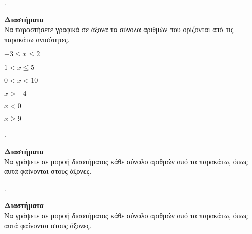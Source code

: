 \documentclass[11pt,a4paper,twocolumn]{article}
\newcounter{askhsh}
\newcommand{\askhsh}{\large\theaskhsh.\ \addtocounter{askhsh}{1}}
\begin{document}
\askhsh \textbf{Διαστήματα}\\
Να παραστήσετε γραφικά σε άξονα τα σύνολα αριθμών που ορίζονται από τις παρακάτω ανισότητες.
\begin{multicols}{3}
\begin{rlist}[leftmargin=2mm]
\item $ -3\leq x\leq 2 $
\item $ 1<x\leq 5 $
\item $ 0<x<10 $
\item $ x>-4 $
\item $ x<0 $
\item $ x\geq 9 $
\end{rlist}
\end{multicols}
\askhsh \textbf{Διαστήματα}\\
Να γράψετε σε μορφή διαστήματος κάθε σύνολο αριθμών από τα παρακάτω, όπως αυτά φαίνονται στους άξονες.
\begin{multicols}{2}
\begin{rlist}
\item \tikzitem{}
\item \tikzitem{}
\item \tikzitem{}
\item \tikzitem{}
\end{rlist}
\end{multicols}
\vspace{-5mm}
\askhsh \textbf{Διαστήματα}\\
Να γράψετε σε μορφή διαστήματος κάθε σύνολο αριθμών από τα παρακάτω, όπως αυτά φαίνονται στους άξονες.
\end{document}
